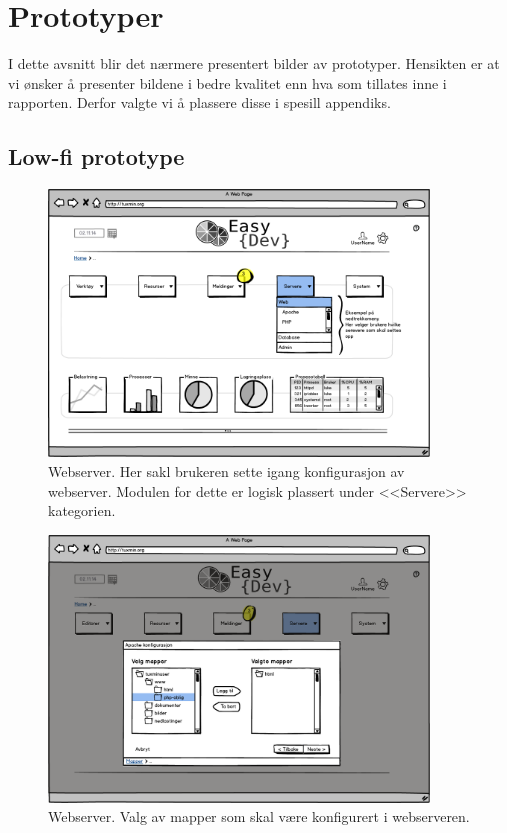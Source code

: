 \chapter{Prototyper}
I dette avsnitt blir det nærmere presentert bilder av prototyper. Hensikten er at vi ønsker å presenter bildene i bedre kvalitet enn hva som tillates inne i rapporten. Derfor valgte vi å plassere disse i spesill appendiks.
\section{Low-fi prototype}
\newcommand{\lowB}{0.9}
\begin{figure}[ht]
\centering
\includegraphics[width=\lowB\textwidth,height=\textheight,keepaspectratio]
{./img/prosessdokumentasjon/lowfi/apache1.png}
\caption[Low-fi Webserver 1]{Webserver. Her sakl brukeren sette igang konfigurasjon av webserver. Modulen for dette er logisk plassert under <<Servere>> kategorien.}
\label{fig:apachelow1}
\end{figure}

\begin{figure}[ht]
\centering
\includegraphics[width=\lowB\textwidth,height=\textheight,keepaspectratio]{./img/prosessdokumentasjon/lowfi/apache2.png}
\caption[Low-fi Webserver 2]{Webserver. Valg av mapper som skal være konfigurert i webserveren.}
\label{fig:apachelow2}
\end{figure}


